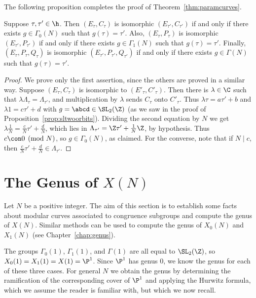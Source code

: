 \documentclass{report}
\begin{document}

The following proposition completes the proof of
Theorem~\ref{thm:paramcurves}.
\begin{proposition}\label{prop:modtau}
Suppose $\tau,\tau'\in\h$.  Then $(E_\tau,C_\tau)$ is isomorphic
$(E_{\tau'}, C_{\tau'})$ if and only if there exists
$g\in\Gamma_0(N)$ such that $g(\tau)=\tau'$.  Also,
$(E_\tau,P_\tau)$ is isomorphic $(E_{\tau'}, P_{\tau'})$ if and
only if there exists $g\in\Gamma_1(N)$ such that $g(\tau)=\tau'$.
Finally, $(E_\tau,P_\tau,Q_\tau)$ is isomorphic $(E_{\tau'},
P_{\tau'},Q_{\tau'})$ if and only if there exists $g\in\Gamma(N)$
such that $g(\tau)=\tau'$.
\end{proposition}
\begin{proof}
We prove only the first assertion, since the others are proved in
a similar way.  Suppose $(E_\tau,C_\tau)$ is isomorphic to
$(E'_\tau, C'_\tau)$.   Then there is $\lambda\in\C$ such that
$\lambda\Lambda_{\tau} = \Lambda_{\tau'}$, and multiplication by
$\lambda$ sends $C_{\tau}$ onto $C'_{\tau}$.  Thus $\lambda\tau =
a\tau'+b$ and $\lambda 1 = c\tau' + d$ with $g=\abcd\in\SL_2(\Z)$
(as we saw in the proof of Proposition~\ref{prop:sltwoorbits}).
Dividing the second equation by $N$ we get $\lambda\frac{1}{N} =
\frac{c}{N}\tau' + \frac{d}{N}$, which lies in $\Lambda_{\tau'} =
\Z\tau' + \frac{1}{N}\Z$, by hypothesis.  Thus $c\con 0\pmod{N}$,
so $g\in\Gamma_0(N)$, as claimed.  For the converse, note that if
$N\mid c$, then $\frac{c}{N}\tau' +
\frac{d}{N}\in\Lambda_{\tau'}$.
\end{proof}




\section{The Genus of $X(N)$}\label{sec:genusxN}
Let $N$ be a positive integer.  The aim of this section is to
establish some facts about modular curves associated to congruence
subgroups and compute the genus of $X(N)$. Similar methods can be used
to compute the genus of $X_0(N)$ and $X_1(N)$ (see
Chapter~\ref{chap:genus}).

The groups $\Gamma_0(1)$, $\Gamma_1(1)$, and $\Gamma(1)$ are all
equal to $\SL_2(\Z)$, so $X_0(1)=X_1(1)=X(1)=\P^1$. Since $\P^1$
has genus $0$, we know the genus for each of these three cases.
For general $N$ we obtain the genus by determining the
ramification of the corresponding cover of $\P^1$ and applying the
Hurwitz formula, which we assume the reader is familiar with, but
which we now recall.
\end{document}
